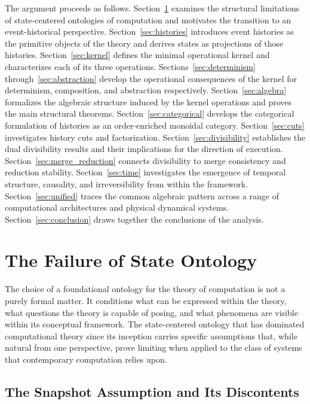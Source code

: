 \documentclass[12pt]{article}
\begin{document}
The argument proceeds as follows. Section~\ref{sec:failure} examines the structural limitations
of state-centered ontologies of computation and motivates the transition to an event-historical
perspective. Section~\ref{sec:histories} introduces event histories as the primitive objects of
the theory and derives states as projections of those histories. Section~\ref{sec:kernel}
defines the minimal operational kernel and characterizes each of its three operations.
Sections~\ref{sec:determinism} through~\ref{sec:abstraction} develop the operational
consequences of the kernel for determinism, composition, and abstraction respectively.
Section~\ref{sec:algebra} formalizes the algebraic structure induced by the kernel operations
and proves the main structural theorems. Section~\ref{sec:categorical} develops the categorical
formulation of histories as an order-enriched monoidal category. Section~\ref{sec:cuts}
investigates history cuts and factorization. Section~\ref{sec:divisibility} establishes the
dual divisibility results and their implications for the direction of execution.
Section~\ref{sec:merge_reduction} connects divisibility to merge consistency and reduction
stability. Section~\ref{sec:time} investigates the emergence of temporal structure, causality,
and irreversibility from within the framework. Section~\ref{sec:unified} traces the common
algebraic pattern across a range of computational architectures and physical dynamical systems.
Section~\ref{sec:conclusion} draws together the conclusions of the analysis.

\section{The Failure of State Ontology}
\label{sec:failure}

The choice of a foundational ontology for the theory of computation is not a purely formal
matter. It conditions what can be expressed within the theory, what questions the theory is
capable of posing, and what phenomena are visible within its conceptual framework. The
state-centered ontology that has dominated computational theory since its inception carries
specific assumptions that, while natural from one perspective, prove limiting when applied to
the class of systems that contemporary computation relies upon.

\subsection{The Snapshot Assumption and Its Discontents}
\end{document}

